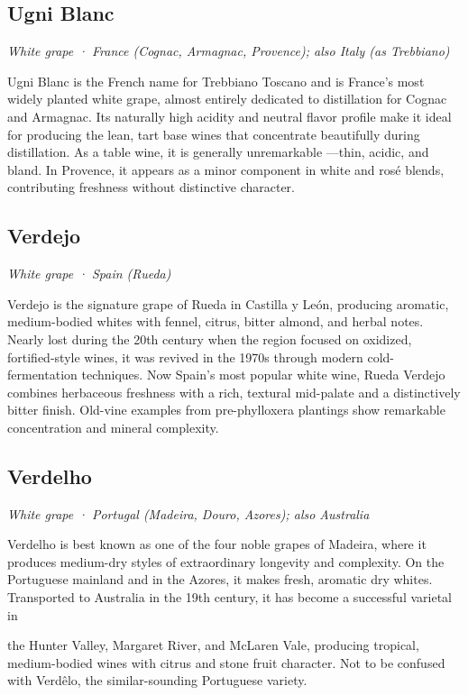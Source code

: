 \subsection*{Ugni Blanc}
\textit{White grape · France (Cognac, Armagnac, Provence); also Italy (as Trebbiano)}\par\smallskip

Ugni Blanc is the French name for Trebbiano Toscano and is France’s most widely planted white grape, almost entirely dedicated to distillation for Cognac and Armagnac. Its naturally high acidity and neutral flavor profile make it ideal for producing the lean, tart base wines that concentrate beautifully during distillation. As a table wine, it is generally unremarkable —thin, acidic, and bland. In Provence, it appears as a minor component in white and rosé blends, contributing freshness without distinctive character.

\subsection*{Verdejo}
\textit{White grape · Spain (Rueda)}\par\smallskip

Verdejo is the signature grape of Rueda in Castilla y León, producing aromatic, medium-bodied whites with fennel, citrus, bitter almond, and herbal notes. Nearly lost during the 20th century when the region focused on oxidized, fortified-style wines, it was revived in the 1970s through modern cold-fermentation techniques. Now Spain’s most popular white wine, Rueda Verdejo combines herbaceous freshness with a rich, textural mid-palate and a distinctively bitter finish. Old-vine examples from pre-phylloxera plantings show remarkable concentration and mineral complexity.

\subsection*{Verdelho}
\textit{White grape · Portugal (Madeira, Douro, Azores); also Australia}\par\smallskip

Verdelho is best known as one of the four noble grapes of Madeira, where it produces medium-dry styles of extraordinary longevity and complexity. On the Portuguese mainland and in the Azores, it makes fresh, aromatic dry whites. Transported to Australia in the 19th century, it has become a successful varietal in

the Hunter Valley, Margaret River, and McLaren Vale, producing tropical, medium-bodied wines with citrus and stone fruit character. Not to be confused with Verdêlo, the similar-sounding Portuguese variety.


